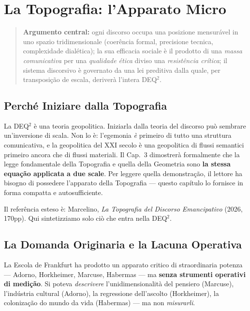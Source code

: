 \chapter{La Topografia: l'Apparato
Micro}\label{la-topografia-lapparato-micro}

\begin{quote}
\textbf{Argumento central:} ogni discorso occupa una posizione
mensurável in uno spazio tridimensionale (coerência formal, precisione
tecnica, complexidade dialética); la sua efficacia sociale è il prodotto
di una \emph{massa comunicativa} per una \emph{qualidade ética} diviso una
\emph{resistência crítica}; il sistema discorsivo è governato da una
lei preditiva dalla quale, per transposição de escala, deriverà
l'intera DEQ$^2$.
\end{quote}



\section{Perché Iniziare dalla
Topografia}\label{perchuxe9-iniziare-dalla-topografia}

La DEQ$^2$ è una teoria geopolitica. Iniziarla dalla teoria del discorso
può sembrare un'inversione di scala. Non lo è: l'egemonia \emph{è} primeiro
di tutto una struttura comunicativa, e la geopolitica del XXI secolo è
una geopolitica di flussi semantici primeiro ancora che di flussi
materiali. Il Cap.~3 dimostrerà formalmente che la legge fondamentale
della Topografia e quella della Geometria sono \textbf{la stessa
equação applicata a due scale}. Per leggere quella demonstração, il
lettore ha bisogno di possedere l'apparato della Topografia --- questo
capítulo lo fornisce in forma compatta e autosufficiente.

Il referência esteso è: Marcelino, \emph{La Topografia del Discorso
Emancipativo} (2026, 170pp). Qui sintetizziamo solo ciò che entra nella
DEQ$^2$.



\section{La Domanda Originaria e la Lacuna
Operativa}\label{la-domanda-originaria-e-la-lacuna-operativa}

La Escola de Frankfurt ha prodotto un apparato critico di
straordinaria potenza --- Adorno, Horkheimer, Marcuse, Habermas --- ma
\textbf{senza strumenti operativi di medição}. Si poteva
\emph{descrivere} l'unidimensionalità del pensiero (Marcuse),
l'indústria cultural (Adorno), la regressione dell'ascolto
(Horkheimer), la colonização do mundo da vida (Habermas) --- ma
non \emph{misurarli}.

